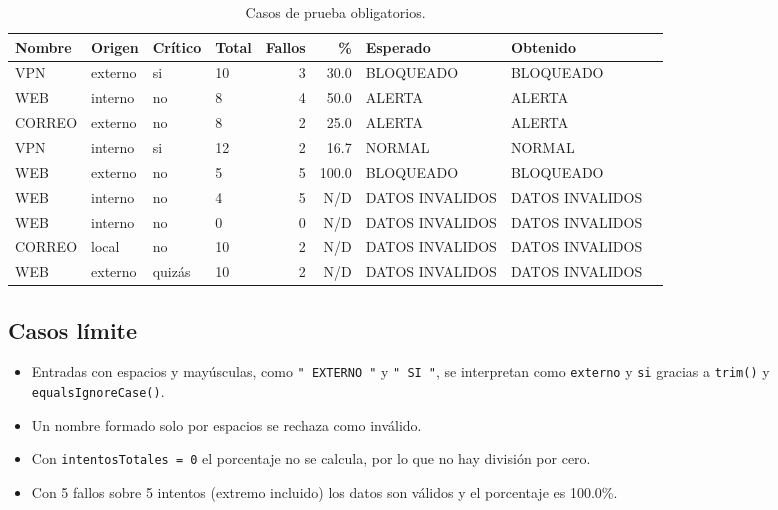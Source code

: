 \documentclass[11pt,a4paper]{article}
\begin{document}
\begin{table}[h!]
\centering
\small
\begin{tabular}{@{}llllrrlll@{}}
\toprule
\textbf{Nombre} & \textbf{Origen} & \textbf{Crítico} & \textbf{Total} & \textbf{Fallos} & \textbf{\%} & \textbf{Esperado} & \textbf{Obtenido} \\
\midrule
VPN    & externo & si     & 10 & 3 & 30.0  & BLOQUEADO & BLOQUEADO \\
WEB    & interno & no     & 8  & 4 & 50.0  & ALERTA    & ALERTA \\
CORREO & externo & no     & 8  & 2 & 25.0  & ALERTA    & ALERTA \\
VPN    & interno & si     & 12 & 2 & 16.7  & NORMAL    & NORMAL \\
WEB    & externo & no     & 5  & 5 & 100.0 & BLOQUEADO & BLOQUEADO \\
WEB    & interno & no     & 4  & 5 & N/D   & DATOS INVALIDOS & DATOS INVALIDOS \\
WEB    & interno & no     & 0  & 0 & N/D   & DATOS INVALIDOS & DATOS INVALIDOS \\
CORREO & local   & no     & 10 & 2 & N/D   & DATOS INVALIDOS & DATOS INVALIDOS \\
WEB    & externo & quizás & 10 & 2 & N/D   & DATOS INVALIDOS & DATOS INVALIDOS \\
\bottomrule
\end{tabular}
\caption{Casos de prueba obligatorios.}
\end{table}

\subsection{Casos límite}
\begin{itemize}[nosep]
  \item Entradas con espacios y mayúsculas, como \texttt{"\ EXTERNO\ "} y \texttt{"\ SI\ "}, se interpretan como \texttt{externo} y \texttt{si} gracias a \texttt{trim()} y \texttt{equalsIgnoreCase()}.
  \item Un nombre formado solo por espacios se rechaza como inválido.
  \item Con \texttt{intentosTotales = 0} el porcentaje no se calcula, por lo que no hay división por cero.
  \item Con 5 fallos sobre 5 intentos (extremo incluido) los datos son válidos y el porcentaje es 100.0\%.
\end{itemize}
\end{document}
